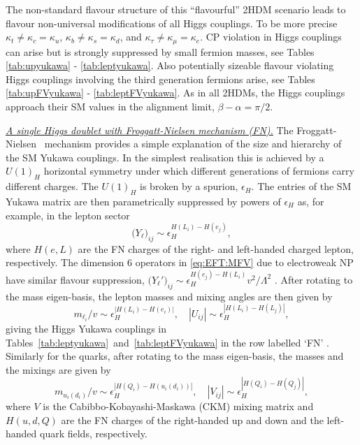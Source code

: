 \documentclass[../report.tex]{subfiles}
\begin{document}
The non-standard flavour structure
of this ``flavourful'' 2HDM scenario leads to flavour non-universal modifications of all Higgs couplings. To be more precise $\kappa_t \neq \kappa_c = \kappa_u$, $\kappa_b \neq \kappa_s = \kappa_d$, and $\kappa_\tau \neq \kappa_\mu = \kappa_e$. CP violation in Higgs couplings can arise but is strongly suppressed by small fermion masses, see Tables \ref{tab:upyukawa} - \ref{tab:leptyukawa}. Also potentially sizeable flavour violating Higgs couplings involving the third generation fermions arise, see Tables \ref{tab:upFVyukawa} - \ref{tab:leptFVyukawa}.
As in all 2HDMs, the Higgs couplings approach their SM values in the alignment limit, $\beta-\alpha=\pi/2$.



\underline{\it A single Higgs doublet with Froggatt-Nielsen mechanism (FN).}
The Froggatt-Nielsen~\cite{Froggatt:1978nt} mechanism provides a simple explanation of the size and hierarchy of the SM Yukawa couplings. In the simplest realisation this is achieved by a $U(1)_H$ horizontal symmetry under which different generations of fermions carry different charges. The $U(1)_H$ is broken by a spurion, $\epsilon_H$.
The entries of the SM Yukawa matrix are then parametrically suppressed by powers of $\epsilon_H$ as, for example, in the lepton sector
\begin{equation}
\big(Y_\ell\big)_{ij}\sim \epsilon_H^{H(L_i)-H(e_j)},
\end{equation}
where $H(e,L)$ are the FN charges of the right- and left-handed charged lepton, respectively. The dimension 6 operators in \eqref{eq:EFT:MFV} due to electroweak NP have similar flavour suppression, $\big(Y_\ell'\big)_{ij}\sim \epsilon_H^{H(e_j)-H(L_i)} v^2/\Lambda^2$ \cite{Dery:2013rta,Dery:2014kxa}. After rotating to the mass eigen-basis, the lepton masses and mixing angles are then given by~\cite{Leurer:1993gy,Grossman:1995hk}
\begin{equation}
m_{\ell_i}/v \sim \epsilon_H^{|H(L_i)-H(e_i)|},\quad
	|U_{ij}|\sim \epsilon_H^{|H(L_i)-H(L_j)|},
\end{equation}
giving the Higgs Yukawa couplings in Tables~\ref{tab:leptyukawa}~and~\ref{tab:leptFVyukawa} in the row labelled `FN' \cite{Dery:2014kxa}.
Similarly for the quarks, after rotating to the mass eigen-basis, the masses and the mixings are given by~\cite{Leurer:1993gy} 
\begin{equation}
m_{u_i(d_i)}/v \sim \epsilon_H^{|H(Q_i)-H(u_i(d_i))|},\quad
|V_{ij}|\sim \epsilon_H^{|H(Q_i)-H(Q_j)|},
\end{equation}
where $V$ is the Cabibbo-Kobayashi-Maskawa (CKM) mixing matrix and $H(u,d,Q)$ are the FN charges of the right-handed up and down and the left-handed quark fields, respectively.
\end{document}
